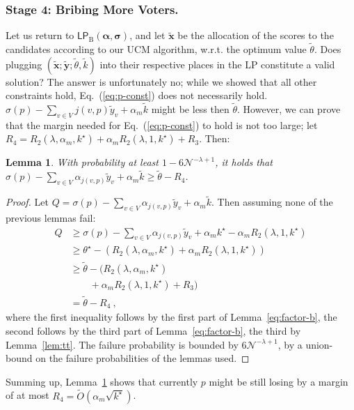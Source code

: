 \documentclass[letterpaper]{article} %
\newtheorem{lemma}[theorem]{Lemma}
\theoremstyle{definition}
\newcommand{\NN}{\mathcal{N}}
\newcommand\vecc{\mathbf}
\newcommand\vecgreek{\bm}
\newcommand{\veca}{\vecgreek{\alpha}}
\newcommand{\vecs}{\vecgreek{\sigma}}
\newcommand{\LPB}{\mathsf{LP}_{\mathrm{B}}}
\begin{document}
\subsubsection{Stage 4: Bribing More Voters.} Let us return to $\LPB(\veca,\vecs)$, and let $\vecc{\tilde{x}}$ be the allocation of the scores to the candidates according to our UCM algorithm, w.r.t. the optimum value $\tilde{\theta}$.
Does plugging $(\vecc{\tilde{x}};\vecc{\tilde{y}};\tilde{\theta}, \tilde{k})$ into their respective places in the LP constitute a valid solution? The answer is unfortunately no; while we showed that all other constraints hold, Eq.~(\ref{eq:p-const}) does not necessarily hold. 
$\sigma(p) - \sum_{v \in V}j(v,p) \tilde{y}_{v} + \alpha_m \tilde{k}$ might be less then $\tilde{\theta}$. 
However, we can prove that the margin needed for Eq.~(\ref{eq:p-const}) to hold is not too large; let $R_4 = R_2(\lambda, \alpha_{m},k^\star)
 +  \alpha_{m}R_2(\lambda, 1,k^\star) + 	R_3$. Then:
\begin{lemma}\label{lem:margin}
	With probability at least $1-6 \NN^{-\lambda + 1}$, it holds that $\sigma(p) - \sum_{v \in V}\alpha_{j(v,p)} \tilde{y}_{v} + \alpha_m\tilde{k} \geq \tilde{\theta}-R_4$.
\end{lemma}
\begin{proof}
	Let $Q=\sigma(p) - \sum_{v \in V}\alpha_{j(v,p)} \tilde{y}_{v} + \alpha_m\tilde{k}$. Then assuming none of the previous lemmas fail:
	\begin{align*}
	Q&\geq \sigma(p) - \sum_{v \in V}\alpha_{j(v,p)} \tilde{y}_{v}+ \alpha_m k^\star- \alpha_{m} R_2(\lambda, 1,k^\star)\\
	&\geq \theta^\star  - (R_2(\lambda, \alpha_{m},k^\star) +  \alpha_{m}R_2(\lambda, 1,k^\star))\\
	&\geq \tilde{\theta}  - (R_2(\lambda, \alpha_{m},k^\star)\\
	&\qquad +  \alpha_{m}R_2(\lambda, 1,k^\star) + 	R_3)\\
	&=\tilde{\theta}  - R_4\ ,
	\end{align*}
	where the first inequality follows by  the first part of Lemma~\ref{eq:factor-b}, the second follows by the third part of Lemma~\ref{eq:factor-b}, the third by Lemma~\ref{lem:tt}. The failure probability is bounded by $6 \NN^{-\lambda + 1}$, by a union-bound on the failure probabilities of the lemmas used. 
\end{proof}
Summing up, Lemma~\ref{lem:margin} shows that currently $p$ might be still losing by a margin of  at most $R_4=\widetilde{O}(\alpha_m\sqrt{k^\star})$.
\end{document}
